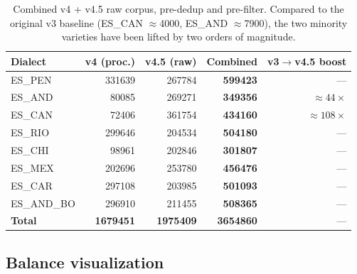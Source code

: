 \documentclass[11pt,a4paper]{article}
\begin{document}
\begin{table}[h]
\centering
\begin{tabular}{l r r r r}
\toprule
\textbf{Dialect} & \textbf{v4 (proc.)} & \textbf{v4.5 (raw)} & \textbf{Combined} & \textbf{v3$\to$v4.5 boost} \\
\midrule
ES\_PEN     & \num{331639} & \num{267784} & \textbf{\num{599423}} & --- \\
ES\_AND     & \num{80085}  & \num{269271} & \textbf{\num{349356}} & $\approx 44\times$ \\
ES\_CAN     & \num{72406}  & \num{361754} & \textbf{\num{434160}} & $\approx 108\times$ \\
ES\_RIO     & \num{299646} & \num{204534} & \textbf{\num{504180}} & --- \\
ES\_CHI     & \num{98961}  & \num{202846} & \textbf{\num{301807}} & --- \\
ES\_MEX     & \num{202696} & \num{253780} & \textbf{\num{456476}} & --- \\
ES\_CAR     & \num{297108} & \num{203985} & \textbf{\num{501093}} & --- \\
ES\_AND\_BO & \num{296910} & \num{211455} & \textbf{\num{508365}} & --- \\
\midrule
\textbf{Total} & \textbf{\num{1679451}} & \textbf{\num{1975409}} & \textbf{\num{3654860}} & --- \\
\bottomrule
\end{tabular}
\caption{Combined v4 + v4.5 raw corpus, pre-dedup and pre-filter.
Compared to the original v3 baseline (ES\_CAN $\approx$\num{4000},
ES\_AND $\approx$\num{7900}), the two minority varieties have been lifted
by two orders of magnitude.}
\label{tab:combined}
\end{table}

\subsection{Balance visualization}
\end{document}
